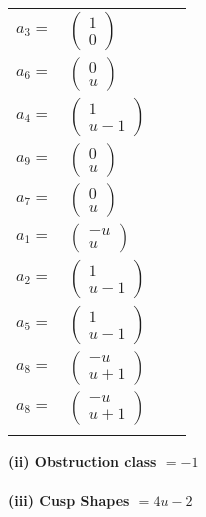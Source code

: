 \documentclass[1p]{elsarticle_modified}
\theoremstyle{definition}
\begin{document}
\begin{tabular}{m{7pt} m{180pt} m{7pt} m{180pt} }
\flushright $a_{3}=$&$\begin{pmatrix}1\\0\end{pmatrix}$ \\
\flushright $a_{6}=$&$\begin{pmatrix}0\\u\end{pmatrix}$ \\
\flushright $a_{4}=$&$\begin{pmatrix}1\\u-1\end{pmatrix}$ \\
\flushright $a_{9}=$&$\begin{pmatrix}0\\u\end{pmatrix}$ \\
\flushright $a_{7}=$&$\begin{pmatrix}0\\u\end{pmatrix}$ \\
\flushright $a_{1}=$&$\begin{pmatrix}- u\\u\end{pmatrix}$ \\
\flushright $a_{2}=$&$\begin{pmatrix}1\\u-1\end{pmatrix}$ \\
\flushright $a_{5}=$&$\begin{pmatrix}1\\u-1\end{pmatrix}$ \\
\flushright $a_{8}=$&$\begin{pmatrix}- u\\u+1\end{pmatrix}$\\ \flushright $a_{8}=$&$\begin{pmatrix}- u\\u+1\end{pmatrix}$\\&\end{tabular}
\flushleft \textbf{(ii) Obstruction class $= -1$}\\~\\
\flushleft \textbf{(iii) Cusp Shapes $= 4 u-2$}\\~\\
\end{document}
